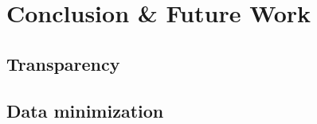 \chapter{Conclusion \& Future Work}
\label{conclude}

\section{Transparency}
\section{Data minimization}